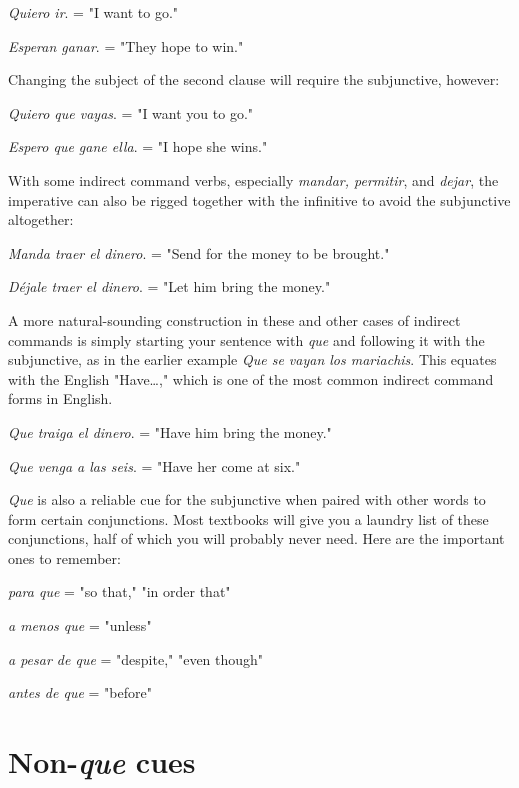 \documentclass[14pt,a4paper,oneside]{memoir}
\newcommand{\bsk}{\vspace{20pt}}
\newcommand{\indu}{\hspace{20pt}}
\begin{document}
\bsk

\indu \emph{Quiero ir}. = "I want to go."

\indu \emph{Esperan ganar}. = "They hope to win."

\bsk

Changing the subject of the second clause will require the subjunctive,
however:

\bsk

\indu \emph{Quiero que vayas}. = "I want you to go."

\indu \emph{Espero que gane ella}. = "I hope she wins."

\bsk

With some indirect command verbs, especially \emph{mandar, permitir}, and \emph{dejar}, the imperative can also be rigged together with the
infinitive to avoid the subjunctive altogether:

\bsk

\indu \emph{Manda traer el dinero}. = "Send for the money to be brought."

\indu \emph{Déjale traer el dinero}. = "Let him bring the money."

\bsk

A more natural-sounding construction in these and other cases of indirect commands is simply starting your sentence with \emph{que} and following it with the subjunctive, as in the earlier example \emph{Que se vayan los
mariachis}. This equates with the English "Have\ldots{}," which is one of
the most common indirect command forms in English.

\bsk

\indu \emph{Que traiga el dinero}. = "Have him bring the money."

\indu \emph{Que venga a las seis}. = "Have her come at six."

\bsk

\emph{Que} is also a reliable cue for the subjunctive when paired with
other words to form certain conjunctions. Most textbooks will give
you a laundry list of these conjunctions, half of which you will probably never need. Here are the important ones to remember:

\bsk

\indu \emph{para que} = "so that," "in order that"

\indu \emph{a menos que} = "unless"

\indu \emph{a pesar de que} = "despite," "even though"

\indu \emph{antes de que} = "before"

\section{Non-\emph{que} cues}
\end{document}
